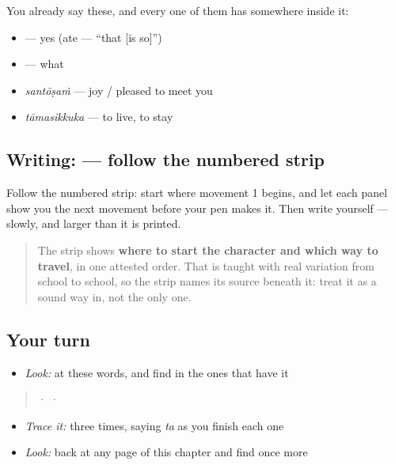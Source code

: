 You already say these, and every one of them has  somewhere inside it:

\begin{itemize}
\raggedright
  \item \textbf{} — yes (ate — \textquotedblleft{}that {[}is so{]}\textquotedblright{})
  \item \textbf{} — what
  \item \textbf{} \emph{santōṣaṁ} — joy / pleased to meet you
  \item \textbf{} \emph{tāmasikkuka} — to live, to stay
\end{itemize}

\subsection*{Writing:  — follow the numbered strip}

Follow the numbered strip: start where movement 1 begins, and let each panel show you the next movement before your pen makes it. Then write  yourself — slowly, and larger than it is printed.

\begin{quote}
The strip shows \textbf{where to start the character and which way to travel}, in one attested order. That is taught with real variation from school to school, so the strip names its source beneath it: treat it as a sound way in, not the only one.
\end{quote}

\subsection*{Your turn}
\begin{itemize}
\raggedright
  \item \emph{Look:} at these words, and find  in the ones that have it
\end{itemize}

\begin{quote}
  ·    ·  
\end{quote}

\begin{itemize}
\raggedright
  \item \emph{Trace it:}  three times, saying \emph{ta} as you finish each one
  \item \emph{Look:} back at any page of this chapter and find  once more
\end{itemize}

